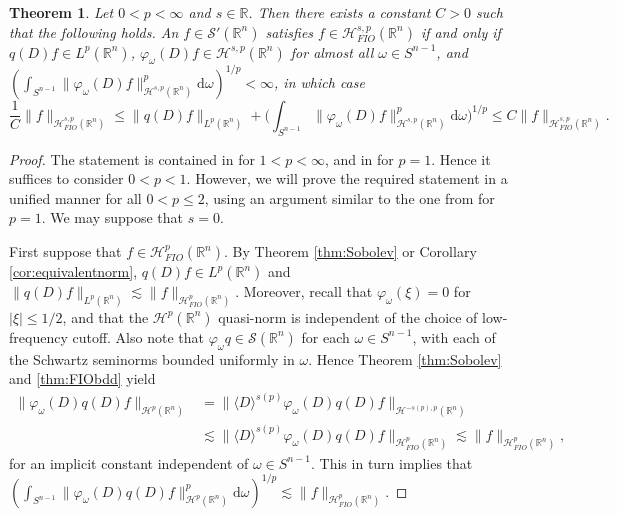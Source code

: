 \documentclass{amsart}
\newcommand {\ud}{\mathrm{d}}
\newcommand {\HT}{\mathcal{H}}
\newcommand {\Hp}{\mathcal{H}^{p}_{FIO}(\Rn)}
\newcommand {\Hps}{\mathcal{H}^{s,p}_{FIO}(\Rn)}
\newcommand {\rb}{\rangle}
\newcommand {\lb}{\langle}
\newcommand {\ph}{\varphi}
\newcommand {\R}{\mathbb R}
\newcommand {\Rn}{\mathbb{R}^{n}}
\newcommand {\Sw}{\mathcal{S}}
\newcommand {\w}{\omega}
\newtheorem{theorem}{Theorem}[section]
\theoremstyle{definition}
\numberwithin{equation}{section}
\begin{document}
\begin{theorem}\label{thm:equivchar}
Let $0<p<\infty$ and $s\in\R$. Then there exists a constant $C>0$ such that the following holds. An $f\in\Sw'(\Rn)$ satisfies $f\in\Hps$ if and only if $q(D)f\in L^{p}(\Rn)$, $\ph_{\w}(D)f\in \HT^{s,p}(\Rn)$ for almost all $\w\in S^{n-1}$, and $(\int_{S^{n-1}}\|\ph_{\w}(D)f\|_{\HT^{s,p}(\Rn)}^{p}\ud \w)^{1/p}<\infty$, in which case
\[
\frac{1}{C}\|f\|_{\Hps}\!\leq\!\|q(D)f\|_{L^{p}(\Rn)}+\Big(\int_{S^{n-1}}\!\|\ph_{\w}(D)f\|_{\HT^{s,p}(\Rn)}^{p}\ud\w\!\Big)^{1/p}\!\leq\!C\|f\|_{\Hps}.
\]
\end{theorem}
\begin{proof}
The statement is contained in \cite[Theorem 1.1]{Rozendaal21} for $1<p<\infty$, and in \cite[Proposition 3.1]{FaLiRoSo23} for $p=1$. Hence it suffices to consider $0<p<1$. However, we will prove the required statement in a unified manner for all $0<p\leq 2$, using an argument similar to the one from \cite{FaLiRoSo23} for $p=1$. We may suppose that $s=0$.

First suppose that $f\in\Hp$. By Theorem \ref{thm:Sobolev} or Corollary \ref{cor:equivalentnorm}, $q(D)f\in L^{p}(\Rn)$ and $\|q(D)f\|_{L^{p}(\Rn)}\lesssim \|f\|_{\Hp}$. Moreover, recall that $\ph_{\w}(\xi)=0$ for $|\xi|\leq 1/2$, and that the $\HT^{p}(\Rn)$ quasi-norm is independent of the choice of low-frequency cutoff. Also note that $\ph_{\w}{q}\in\Sw(\Rn)$ for each $\w\in S^{n-1}$, with each of the Schwartz seminorms bounded uniformly in $\w$. Hence Theorem \ref{thm:Sobolev} and \ref{thm:FIObdd} yield
\begin{align*}
\|\ph_{\w}(D)q(D)f\|_{\HT^{p}(\Rn)}&=\|\lb D\rb^{s(p)}\ph_{\w}(D)q(D)f\|_{\HT^{-s(p),p}(\Rn)}\\
&\lesssim \|\lb D\rb^{s(p)}\ph_{\w}(D)q(D)f\|_{\Hp}\lesssim \|f\|_{\Hp},
\end{align*}
for an implicit constant independent of $\w\in S^{n-1}$. This in turn implies that $(\int_{S^{n-1}}\|\ph_{\w}(D)q(D)f\|_{\HT^{p}(\Rn)}^{p}\ud\w)^{1/p}\lesssim \|f\|_{\Hp}$. 


\end{proof}
\end{document}
